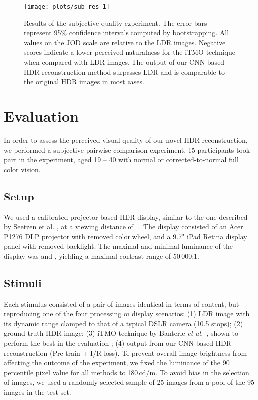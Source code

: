 \documentclass[acmtog]{acmart}
\newcommand{\etal}{\emph{et al.\ }}
\newcommand\belowfigspace{-2pt}
\newcommand\customsection[1]{\subsection{#1}}
\begin{document}
\begin{figure*}[]
	\centering
	\texttt{[image: plots/sub\_res\_1]}
	\vspace{-15pt}
	\caption{\label{fig:eval_pwc} Results of the subjective quality experiment. The error bars represent 95\% confidence intervals computed by bootstrapping. All values on the JOD scale are relative to the LDR images. Negative scores indicate a lower perceived naturalness for the iTMO technique when compared with LDR images. The output of our CNN-based HDR reconstruction method surpasses LDR and is comparable to the original HDR images in most cases.}
	\vspace{\belowfigspace}
\end{figure*}

\section{Evaluation}\label{sec:evaluation}
In order to assess the perceived visual quality of our novel HDR reconstruction, we performed a subjective pairwise comparison experiment. 15 participants took part in the experiment, aged 19 -- 40 with normal or corrected-to-normal full color vision. 

\customsection{Setup}
We used a calibrated projector-based HDR display, similar to the one described by Seetzen et al. \citeyear{Seetzen:2004:HDR:1015706.1015797}, at a viewing distance of ~. The display consisted of an Acer P1276  DLP projector with removed color wheel, and a 9.7"  iPad Retina display panel with removed backlight. The maximal and minimal luminance of the display was  and , yielding a maximal contrast range of 50\,000:1. 

\customsection{Stimuli}
Each stimulus consisted of a pair of images identical in terms of content, but reproducing one of the four processing or display scenarios: (1) LDR image with its dynamic range clamped to that of a typical DSLR camera (10.5 stops); (2) ground truth HDR image; (3) iTMO technique by Banterle \etal \citeyear{Banterle2008}, shown to perform the best in the evaluation \cite{Banterle2009}; (4) output from our CNN-based HDR reconstruction (Pre-train + I/R loss). To prevent overall image brightness from affecting the outcome of the experiment, we fixed the luminance of the 90 percentile pixel value for all methods to 180\,cd/m. To avoid bias in the selection of images, we used a randomly selected sample of 25 images from a pool of the 95 images in the test set.
\end{document}
